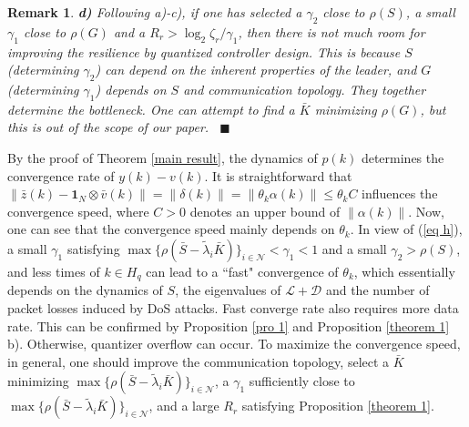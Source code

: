 \documentclass{autart}
\def\qedp{\hspace*{\fill}~{\tiny $\blacksquare$}}
\def\qedp{\hspace*{\fill}~{\tiny $\blacksquare$}}
\newtheorem{itremark}{Remark}
\newenvironment{remark}{\begin{itremark}\rm}{\end{itremark}}
\begin{document}
\begin{remark}
\textbf{d)} Following a)-c), if one has selected a $\gamma_2$ close to $\rho(S)$, a small $\gamma_1$ close to $\rho(G)$ and a $R_r> \log_2 \zeta_r /\gamma_1$, then there is not much room for improving the resilience by quantized controller design. This is because $S$ (determining $\gamma_2$) can depend on the inherent properties of the leader, and $G$ (determining $\gamma_1$) depends on $S$ and communication topology. They together determine the bottleneck. One can attempt to find a $\bar K$ minimizing $\rho(G)$, but this is out of the scope of our paper. \qedp





\end{remark}








By the proof of Theorem \ref{main result}, the dynamics of $p(k)$ determines the convergence rate of $y(k)-v(k)$. It is straightforward that $\|\bar z(k)-\mathbf 1_N \otimes \bar v(k)\| = \|\delta(k)\| = \|\theta_k \alpha(k)\| \le \theta_k C$ influences the convergence speed, where $C>0$ denotes an upper bound of $\|\alpha(k)\|$. Now, one can see that the convergence speed mainly depends on $\theta_k$. In view of (\ref{eq h}), a small $\gamma_1$ satisfying $\max \{\rho(\bar  S - \tilde \lambda _i \bar K) \}_{i \in \mathcal N}<\gamma_1<1$ and a small $\gamma_2 > \rho(S)$, and less times of $k \in H_q$ can lead to a ``fast" convergence of $\theta_k$, which essentially depends on the dynamics of $S$, the eigenvalues of $\mathcal{L+D}$ and the number of packet losses induced by DoS attacks. Fast converge rate also requires more data rate. This can be confirmed by Proposition \ref{pro 1} and Proposition \ref{theorem 1} b). Otherwise, quantizer overflow can occur. To maximize the convergence speed, in general, one should improve the communication topology, select a $\bar K$ minimizing $\max \{\rho(\bar  S - \tilde \lambda _i \bar K) \}_{i \in \mathcal N}$, a $\gamma_1$ sufficiently close to $\max \{\rho(\bar  S - \tilde \lambda _i \bar K) \}_{i \in \mathcal N}$, and a large $R_r$ satisfying Proposition \ref{theorem 1}.     
\end{document}
